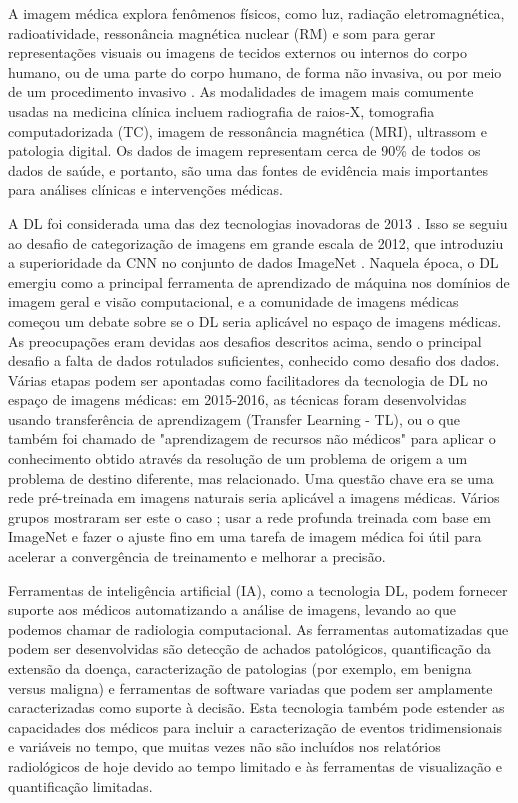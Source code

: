 \documentclass[
	12pt,				%
	openany,oneside,
	a4paper,			%
	english,			%
	brazil,				%
	]{abntex2}
\begin{document}
A imagem médica explora fenômenos físicos, como luz, radiação eletromagnética, radioatividade, ressonância magnética nuclear (RM) e som para gerar representações visuais ou imagens de tecidos externos ou internos do corpo humano, ou de uma parte do corpo humano, de forma não invasiva, ou por meio de um procedimento invasivo \cite{c1}. As modalidades de imagem mais comumente usadas na medicina clínica incluem radiografia de raios-X, tomografia computadorizada (TC), imagem de ressonância magnética (MRI), ultrassom e patologia digital. Os dados de imagem representam cerca de 90\% de todos os dados de saúde, e portanto, são uma das fontes de evidência mais importantes para análises clínicas e intervenções médicas.

A DL foi considerada uma das dez tecnologias inovadoras de 2013 \cite{c3}. Isso se seguiu ao desafio de categorização de imagens em grande escala de 2012, que introduziu a superioridade da CNN no conjunto de dados ImageNet \cite{c4}. Naquela época, o DL emergiu como a principal ferramenta de aprendizado de máquina nos domínios de imagem geral e visão computacional, e a comunidade de imagens médicas começou um debate sobre se o DL seria aplicável no espaço de imagens médicas. As preocupações eram devidas aos desafios descritos acima, sendo o principal desafio a falta de dados rotulados suficientes, conhecido como desafio dos dados. Várias etapas podem ser apontadas como facilitadores da tecnologia de DL no espaço de imagens médicas: em 2015-2016, as técnicas foram desenvolvidas usando transferência de aprendizagem (Transfer Learning - TL), ou o que também foi chamado de "aprendizagem de recursos não médicos" \cite{c5} para aplicar o conhecimento obtido através da resolução de um problema de origem a um problema de destino diferente, mas relacionado. Uma questão chave era se uma rede pré-treinada em imagens naturais seria aplicável a imagens médicas. Vários grupos mostraram ser este o caso \cite{c6,c7}; usar a rede profunda treinada com base em ImageNet e fazer o ajuste fino em uma tarefa de imagem médica foi útil para acelerar a convergência de treinamento e melhorar a precisão.

Ferramentas de inteligência artificial (IA), como a tecnologia DL, podem fornecer suporte aos médicos automatizando a análise de imagens, levando ao que podemos chamar de radiologia computacional. As ferramentas automatizadas que podem ser desenvolvidas são detecção de achados patológicos, quantificação da extensão da doença, caracterização de patologias (por exemplo, em benigna versus maligna) e ferramentas de software variadas que podem ser amplamente caracterizadas como suporte à decisão. Esta tecnologia também pode estender as capacidades dos médicos para incluir a caracterização de eventos tridimensionais e variáveis no tempo, que muitas vezes não são incluídos nos relatórios radiológicos de hoje devido ao tempo limitado e às ferramentas de visualização e quantificação limitadas. 
\end{document}
